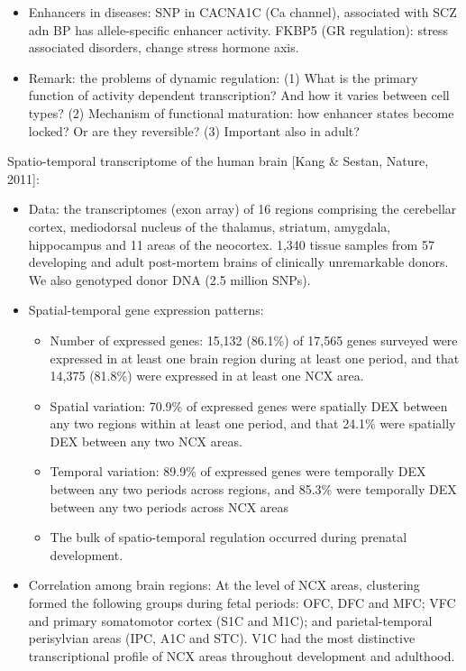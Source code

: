 \documentclass{report}
\begin{document}
\begin{itemize}
	\item Enhancers in diseases: SNP in CACNA1C (Ca channel), associated with SCZ adn BP has allele-specific enhancer activity. FKBP5 (GR regulation): stress associated disorders, change stress hormone axis.
	
	\item Remark: the problems of dynamic regulation: (1) What is the primary function of activity dependent transcription? And how it varies between cell types? (2) Mechanism of functional maturation: how enhancer states become locked? Or are they reversible? (3) Important also in adult?
\end{itemize}

Spatio-temporal transcriptome of the human brain [Kang \& Sestan, Nature, 2011]:
\begin{itemize}
	\item Data: the transcriptomes (exon array) of 16 regions comprising the cerebellar cortex, mediodorsal nucleus of the thalamus, striatum, amygdala, hippocampus and 11 areas of the neocortex. 1,340 tissue samples from 57 developing and adult post-mortem brains of clinically unremarkable donors. We also genotyped donor DNA (2.5 million SNPs). 
	
	\item Spatial-temporal gene expression patterns: 
	\begin{itemize}
		\item Number of expressed genes: 15,132 (86.1\%) of 17,565 genes surveyed were expressed in at least one brain region during at least one period, and that 14,375 (81.8\%) were expressed in at least one NCX area. 
		
		\item Spatial variation: 70.9\% of expressed genes were spatially DEX between any two regions within at least one period, and that 24.1\% were spatially DEX between any two NCX areas. 
		
		\item Temporal variation: 89.9\% of expressed genes were temporally DEX between any two periods across regions, and 85.3\% were temporally DEX between any two periods across NCX areas
		
		\item The bulk of spatio-temporal regulation occurred during prenatal development.
	\end{itemize}
	
	\item Correlation among brain regions:  At the level of NCX areas, clustering formed the following groups during fetal periods: OFC, DFC and MFC; VFC and primary somatomotor cortex (S1C and M1C); and parietal-temporal perisylvian areas (IPC, A1C and STC). V1C had the most distinctive transcriptional profile of NCX areas throughout development and adulthood.
	

\end{itemize}
\end{document}
